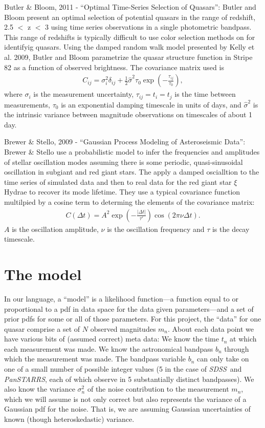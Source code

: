 \documentclass[letterpaper,12pt,preprint]{aastex}
\newcommand{\project}[1]{\textsl{#1}}
\newcommand{\sdss}{\project{SDSS}}
\newcommand{\panstarrs}{\project{PanSTARRS}}
\begin{document}
Butler \& Bloom, 2011 - ``Optimal Time-Series Selection of Quasars'':
Butler and Bloom present an optimal selection of potential quasars in the range of redshift, 2.5 $<$ z $<$ 3 using time series observations in a single photometric bandpass. This range of redshifts is typically difficult to use color selection methods on for identifyig quasars. Using the damped random walk model presented by Kelly et al. 2009, Butler and Bloom parametrize the quasar structure function in Stripe 82 as a function of observed brightness. The covariance matrix used is
\begin{eqnarray}
C_{ij}=\sigma_i^2 \delta_{ij} + \frac{1}{2}\hat{\sigma}^2 \tau_0 \exp \left(-\frac{\tau_{ij}}{\tau_0}\right),
\end{eqnarray}
where $\sigma_i$ is the measurement uncertainty, $\tau_{ij}=t_i=t_j$ is the time between measurements, $\tau_0$ is an exponential damping timescale in units of days, and $\hat{\sigma}^2$ is the intrinsic variance between magnitude observations on timescales of about 1 day.

Brewer \& Stello, 2009 - ``Gaussian Process Modeling of Asteroseismic Data'':
Brewer \& Stello use a probabilistic model to infer the frequencies and amplitudes of stellar oscillation modes assuming there is some periodic, quasi-sinusoidal oscillation in subgiant and red giant stars. The apply a damped oscialltion to the time series of simulated data and then to real data for the red giant star $\xi$ Hydrae to recover its mode lifetime. They use a typical covariance function multilpied by a cosine term to determing the elements of the covariance matrix:
\begin{eqnarray}
C(\Delta t)= A^2 \exp \left( -\frac{|\Delta t|}{\tau'}\right ) \cos (2 \pi \nu \Delta t).
\end{eqnarray}
$A$ is the oscillation amplitude, $\nu$ is the oscillation frequency and $\tau$ is the decay timescale.


\section{The model}

In our language, a ``model'' is a likelihood function---a function
equal to or proportional to a pdf in data space for the data given
parameters---and a set of prior pdfs for some or all of those
parameters.  For this project, the ``data'' for one quasar comprise a
set of $N$ observed magnitudes $m_n$.  About each data point we have
various bits of (assumed correct) meta data: We know the time $t_n$ at
which each measurement was made.  We know the astronomical bandpass
$b_n$ through which the measurement was made.  The bandpass variable
$b_n$ can only take on one of a small number of possible integer
values (5 in the case of \sdss\ and \panstarrs, each of which observe
in 5 substantially distinct bandpasses).  We also know the variance
$\sigma_n^2$ of the noise contribution to the measurement $m_n$, which
we will assume is not only correct but also represents the variance of
a Gaussian pdf for the noise.  That is, we are assuming Gaussian
uncertainties of known (though heteroskedastic) variance.
\end{document}
